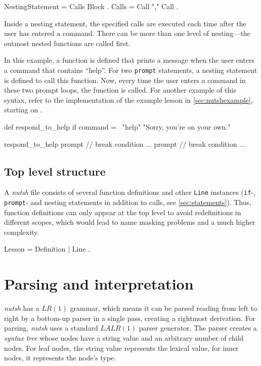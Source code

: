 \documentclass[paper=a4,twoside,abstract=on,cleardoublepage=empty,numbers=noenddot,toc=bib,toc=listof,12pt,appendixprefix=true]{scrreprt}
\begin{document}
\begin{ebnf}
NestingStatement = Calls Block .
Calls = Call { "," Call } .
\end{ebnf}
%
Inside a nesting statement, the specified calls are executed each time after the user has entered a command. There can be more than one level of nesting---the outmost nested functions are called first.

In this example, a function is defined that prints a message when the user enters a command that contains “help”. For two \texttt{prompt} statements, a nesting statement is defined to call this function. Now, every time the user enters a command in these two prompt loops, the function is called. For another example of this syntax, refer to the implementation of the example lesson in \cref{sec:nutshexample}, starting on .

\begin{nutsh}
def respond_to_help {
    if command =~ "help" {
        "Sorry, you're on your own."
    }
}

respond_to_help {
    prompt {
        // break condition ...
    }
    prompt {
        // break condition ...
    }
}
\end{nutsh}

\subsection{Top level structure}

A \emph{nutsh} file consists of several function definitions and other \texttt{Line} instances (\texttt{if}-, \texttt{prompt}- and nesting statements in addition to calls, see \cref{sec:statements}). Thus, function definitions can only appear at the top level to avoid redefinitions in different scopes, which would lead to name masking problems and a much higher complexity.

\begin{ebnf}
Lesson = { Definition | Line } .
\end{ebnf}

\section{Parsing and interpretation}

\emph{nutsh} has a $LR(1)$ grammar, which means it can be parsed reading from left to right by a bottom-up parser in a single pass, creating a rightmost derivation. For parsing, \emph{nutsh} uses a standard $LALR(1)$ parser generator.
The parser creates a \emph{syntax tree} whose nodes have a string value and an arbitrary number of child nodes. For leaf nodes, the string value represents the lexical value, for inner nodes, it represents the node's type.
\end{document}
